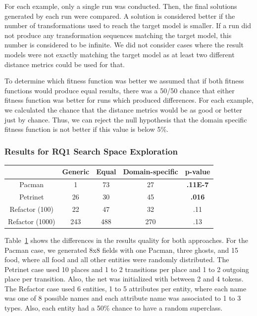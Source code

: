 For each example, only a single run was conducted. Then, the final solutions generated by each run were compared.
A solution is considered better if the number of transformations used to reach the target model is smaller. If a run did 
not produce any transformation sequences matching the target model, this number is considered to be infinite. We did not consider cases where 
the result models were not exactly matching the target model as at least two different distance metrics could be used for that.

To determine which fitness function was better we assumed that if both fitness functions would produce equal results,
there was a 50/50 chance that either fitness function was better for runs which produced differences.
For each example, we calculated the chance that the distance metrics would be as good or better just by chance.
Thus, we can reject the null hypothesis that the domain specific fitness function is not better if this value is below 5\%.



\subsubsection{Results for RQ1 Search Space Exploration}

\begin{table}
\begin{tabular}{|c|c|c|c|c|}
\hline
 & Generic & Equal & Domain-specific & p-value \\
\hline
Pacman & 1 & 73 & 27 & \textbf{.11E-7} \\
\hline
Petrinet & 26 & 30 & 45 & \textbf{.016} \\
\hline
Refactor (100) & 22 & 47 & 32 & .11 \\
\hline
Refactor (1000) & 243 & 488 & 270 & .13 \\
\hline
\end{tabular}
\label{tab:resultsrq1}
\end{table}

Table~\ref{tab:resultsrq1} shows the differences in the results quality for both approaches. For the Pacman case, we generated 8x8 fields with one Pacman, three ghosts, and 15 food, where all food and all other entities were randomly distributed. The Petrinet case used 10 places and 1 to 2 transitions per place and 1 to 2 outgoing place per transition. Also, the net was initialized with between 2 and 4 tokens. The Refactor case used 6 entities, 1 to 5 attributes per entity, where each name was one of 8 possible names and each attribute name was associated to 1 to 3 types. Also, each entity had a 50\% chance to have a random superclass. 

